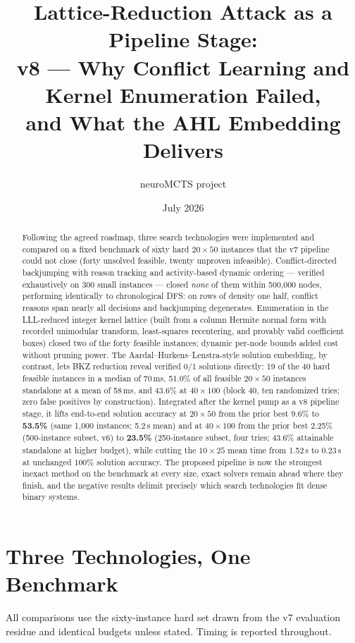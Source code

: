 \documentclass[12pt]{article}
\title{Lattice-Reduction Attack as a Pipeline Stage:\\
v8 --- Why Conflict Learning and Kernel Enumeration Failed,\\
and What the AHL Embedding Delivers}
\author{neuroMCTS project}
\date{July 2026}
\begin{document}
\maketitle

\begin{abstract}
Following the agreed roadmap, three search technologies were implemented and compared on a fixed benchmark of sixty hard $20 \times 50$ instances that the v7 pipeline could not close (forty unsolved feasible, twenty unproven infeasible). Conflict-directed backjumping with reason tracking and activity-based dynamic ordering --- verified exhaustively on 300 small instances --- closed \emph{none} of them within 500{,}000 nodes, performing identically to chronological DFS: on rows of density one half, conflict reasons span nearly all decisions and backjumping degenerates. Enumeration in the LLL-reduced integer kernel lattice (built from a column Hermite normal form with recorded unimodular transform, least-squares recentering, and provably valid coefficient boxes) closed two of the forty feasible instances; dynamic per-node bounds added cost without pruning power. The Aardal--Hurkens--Lenstra-style solution embedding, by contrast, lets BKZ reduction reveal verified 0/1 solutions directly: 19 of the 40 hard feasible instances in a median of 70\,ms, 51.0\% of all feasible $20 \times 50$ instances standalone at a mean of 58\,ms, and 43.6\% at $40 \times 100$ (block 40, ten randomized tries; zero false positives by construction). Integrated after the kernel pump as a v8 pipeline stage, it lifts end-to-end solution accuracy at $20 \times 50$ from the prior best 9.6\% to \textbf{53.5\%} (same 1{,}000 instances; 5.2\,s mean) and at $40 \times 100$ from the prior best 2.25\% (500-instance subset, v6) to \textbf{23.5\%} (250-instance subset, four tries; 43.6\% attainable standalone at higher budget), while cutting the $10 \times 25$ mean time from 1.52\,s to 0.23\,s at unchanged 100\% solution accuracy. The proposed pipeline is now the strongest inexact method on the benchmark at every size, exact solvers remain ahead where they finish, and the negative results delimit precisely which search technologies fit dense binary systems.
\end{abstract}

\section{Three Technologies, One Benchmark}

All comparisons use the sixty-instance hard set drawn from the v7 evaluation residue and identical budgets unless stated. Timing is reported throughout.
\end{document}
